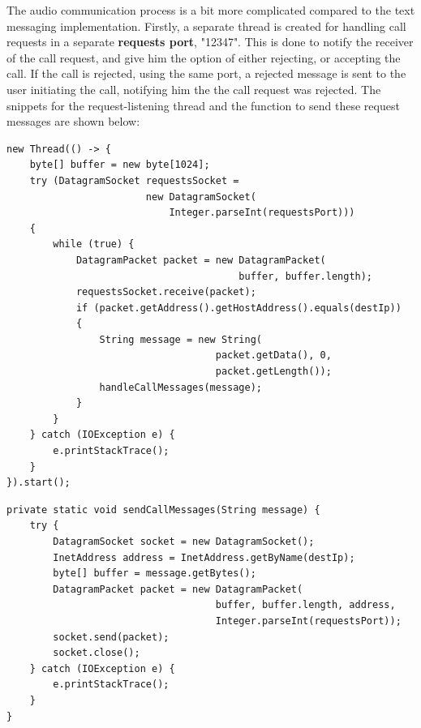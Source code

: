 \documentclass[12pt]{report}
\begin{document}
The audio communication process is a bit more complicated compared to the text messaging implementation. Firstly, a separate thread is created for handling call requests in a separate \textbf{requests port}, "12347". This is done to notify the receiver of the call request, and give him the option of either rejecting, or accepting the call. If the call is rejected, using the same port, a rejected message is sent to the user initiating the call, notifying him the the call request was rejected. The snippets for the request-listening thread and the function to send these request messages are shown below:
\begin{lstlisting}[style=javastyle]
new Thread(() -> {
	byte[] buffer = new byte[1024];
	try (DatagramSocket requestsSocket = 
                        new DatagramSocket(
                            Integer.parseInt(requestsPort)))
    {
		while (true) {
			DatagramPacket packet = new DatagramPacket(
                                        buffer, buffer.length);
			requestsSocket.receive(packet);
			if (packet.getAddress().getHostAddress().equals(destIp))
            {
				String message = new String(
                                    packet.getData(), 0,
                                    packet.getLength());
				handleCallMessages(message);
			}
		}
	} catch (IOException e) {
		e.printStackTrace();
	}
}).start();
\end{lstlisting}


\begin{lstlisting}[style=javastyle]
private static void sendCallMessages(String message) {
	try {
		DatagramSocket socket = new DatagramSocket();
		InetAddress address = InetAddress.getByName(destIp);
		byte[] buffer = message.getBytes();
		DatagramPacket packet = new DatagramPacket(
                                    buffer, buffer.length, address,
                                    Integer.parseInt(requestsPort));
		socket.send(packet);
		socket.close();
	} catch (IOException e) {
		e.printStackTrace();
	}
}
\end{lstlisting}
\end{document}
